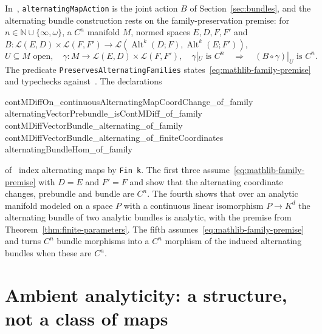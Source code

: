 \documentclass[11pt]{amsart}
\theoremstyle{definition}
\theoremstyle{remark}
\numberwithin{equation}{section}
\newcommand{\N}{\mathbb N}
\newcommand{\cL}{\mathcal L}
\newcommand{\Alt}{\operatorname{Alt}}
\theoremstyle{plain}
\theoremstyle{definition}
\theoremstyle{plain}
\begin{document}
In~\cite{LeanP}, \texttt{alternatingMapAction} is the joint action $B$ of Section~\ref{sec:bundles}, and
the alternating bundle construction rests on the family-preservation premise: for $n\in\N\cup\{\infty,\omega\}$, a
$C^n$ manifold $M$, normed spaces $E,D,F,F'$ and $B\colon\cL(E,D)\times\cL(F,F')\to\cL(\Alt^k(D;F),\Alt^k(E;F'))$,
\begin{equation}\label{eq:mathlib-family-premise}
 U\subseteq M\text{ open},\quad \gamma\colon M\to\cL(E,D)\times\cL(F,F'),\quad \gamma|_U\text{ is }C^n
 \quad\Longrightarrow\quad (B\circ\gamma)|_U\text{ is }C^n.
\end{equation}
The predicate \texttt{PreservesAlternatingFamilies} states~\eqref{eq:mathlib-family-premise} and typechecks
against~\cite{LeanP}. The declarations
\begin{leancode}
contMDiffOn_continuousAlternatingMapCoordChange_of_family
alternatingVectorPrebundle_isContMDiff_of_family
contMDiffVectorBundle_alternating_of_family
contMDiffVectorBundle_alternating_of_finiteCoordinates
alternatingBundleHom_of_family
\end{leancode}
of~\cite{LeanP} index alternating maps by \texttt{Fin k}. The first three assume~\eqref{eq:mathlib-family-premise}
with $D=E$ and $F'=F$ and show that the alternating coordinate changes, prebundle and bundle are $C^n$. The fourth shows
that over an analytic manifold modeled on a space $P$ with a continuous linear isomorphism $P\to K^d$ the alternating
bundle of two analytic bundles is analytic, with the premise from Theorem~\ref{thm:finite-parameters}. The fifth
assumes~\eqref{eq:mathlib-family-premise} and turns $C^n$ bundle morphisms into a $C^n$ morphism of the induced
alternating bundles when these are $C^n$.
\section{Ambient analyticity: a structure, not a class of maps}\label{amb:sec}
\end{document}
